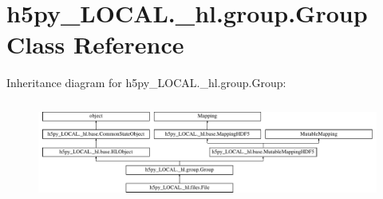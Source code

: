 \hypertarget{classh5py__LOCAL_1_1__hl_1_1group_1_1Group}{}\section{h5py\+\_\+\+L\+O\+C\+A\+L.\+\_\+hl.\+group.\+Group Class Reference}
\label{classh5py__LOCAL_1_1__hl_1_1group_1_1Group}
Inheritance diagram for h5py\+\_\+\+L\+O\+C\+A\+L.\+\_\+hl.\+group.\+Group\+:\begin{figure}[H]
\begin{center}
\leavevmode
\includegraphics[height=3.333333cm]{classh5py__LOCAL_1_1__hl_1_1group_1_1Group}
\end{center}
\end{figure}
